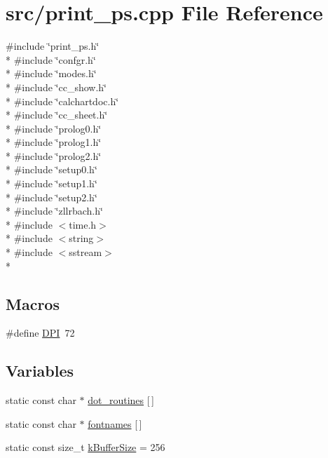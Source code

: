 \hypertarget{a00238}{\section{src/print\-\_\-ps.cpp File Reference}
\label{a00238}
}
{\ttfamily \#include \char`\"{}print\-\_\-ps.\-h\char`\"{}}\\*
{\ttfamily \#include \char`\"{}confgr.\-h\char`\"{}}\\*
{\ttfamily \#include \char`\"{}modes.\-h\char`\"{}}\\*
{\ttfamily \#include \char`\"{}cc\-\_\-show.\-h\char`\"{}}\\*
{\ttfamily \#include \char`\"{}calchartdoc.\-h\char`\"{}}\\*
{\ttfamily \#include \char`\"{}cc\-\_\-sheet.\-h\char`\"{}}\\*
{\ttfamily \#include \char`\"{}prolog0.\-h\char`\"{}}\\*
{\ttfamily \#include \char`\"{}prolog1.\-h\char`\"{}}\\*
{\ttfamily \#include \char`\"{}prolog2.\-h\char`\"{}}\\*
{\ttfamily \#include \char`\"{}setup0.\-h\char`\"{}}\\*
{\ttfamily \#include \char`\"{}setup1.\-h\char`\"{}}\\*
{\ttfamily \#include \char`\"{}setup2.\-h\char`\"{}}\\*
{\ttfamily \#include \char`\"{}zllrbach.\-h\char`\"{}}\\*
{\ttfamily \#include $<$time.\-h$>$}\\*
{\ttfamily \#include $<$string$>$}\\*
{\ttfamily \#include $<$sstream$>$}\\*
\subsection*{Macros}
\begin{DoxyCompactItemize}
\item 
\#define \hyperlink{a00238_a9dcb542bc9dbcae41fdb39a689798698}{D\-P\-I}~72
\end{DoxyCompactItemize}
\subsection*{Variables}
\begin{DoxyCompactItemize}
\item 
static const char $\ast$ \hyperlink{a00238_ae61faeb1e4eee1b74eb621f84c36769f}{dot\-\_\-routines} \mbox{[}$\,$\mbox{]}
\item 
static const char $\ast$ \hyperlink{a00238_a6a8f9c932a4206dfed73898572cdcbca}{fontnames} \mbox{[}$\,$\mbox{]}
\item 
static const size\-\_\-t \hyperlink{a00238_a8697f12f5aa5bb2f7df98e95ada68d16}{k\-Buffer\-Size} = 256
\end{DoxyCompactItemize}


